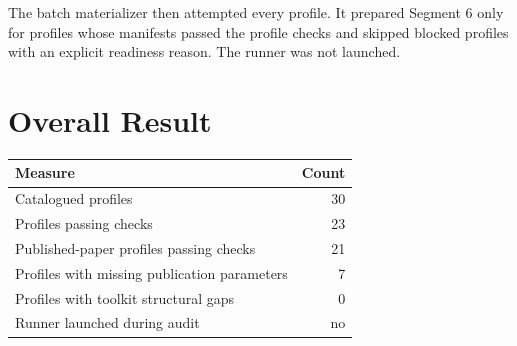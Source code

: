 \documentclass[11pt]{article}
\begin{document}
The batch materializer then attempted every profile. It prepared Segment 6 only for profiles whose manifests passed the profile checks and skipped blocked profiles with an explicit readiness reason. The runner was not launched.

\section*{Overall Result}
\begin{center}
\begin{tabular}{lr}
\toprule
Measure & Count \\
\midrule
Catalogued profiles & 30 \\
Profiles passing checks & 23 \\
Published-paper profiles passing checks & 21 \\
Profiles with missing publication parameters & 7 \\
Profiles with toolkit structural gaps & 0 \\
Runner launched during audit & no \\
\bottomrule
\end{tabular}
\end{center}
\end{document}
